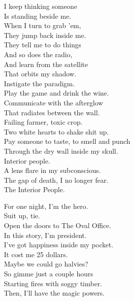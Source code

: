 I keep thinking someone \\
Is standing beside me. \\
When I turn to grab 'em, \\
They jump back inside me. \\
They tell me to do things \\
And so does the radio, \\
And learn from the satellite \\
That orbits my shadow. \\

Instigate the paradigm. \\
Play the game and drink the wine. \\
Communicate with the afterglow \\
That radiates between the wall. \\

Failing farmer, toxic crop. \\
Two white hearts to shake shit up. \\
Pay someone to taste, to smell and punch \\
Through the dry wall inside my skull. \\

Interior people. \\
A lens flare in my subconscious. \\
The gap of death, I no longer fear. \\
The Interior People. \\





For one night, I'm the hero. \\
Suit up, tie. \\
Open the doors to The Oval Office. \\
In this story, I'm president. \\

I've got happiness inside my pocket. \\
It cost me 25 dollars. \\
Maybe we could go halvies? \\
So gimme just a couple hours \\
Starting fires with soggy timber. \\
Then, I'll have the magic powers. \\

